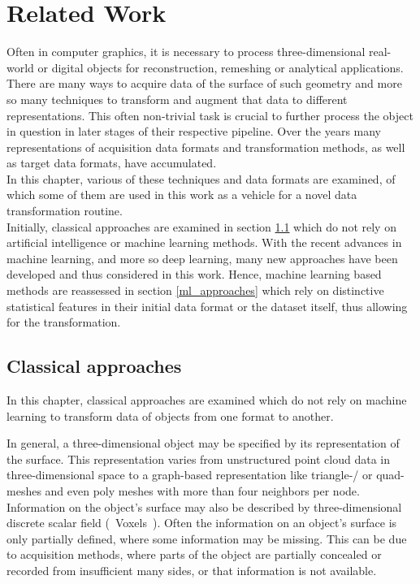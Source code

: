 \chapter{Related Work}
\label{sec:relatedwork}

Often in computer graphics, it is necessary to process three-dimensional real-world or digital objects for reconstruction, remeshing or analytical applications. There are many ways to acquire data of the surface of such geometry and more so many techniques to transform and augment that data to different representations. This often non-trivial task is crucial to further process the object in question in later stages of their respective pipeline. Over the years many representations of acquisition data formats and transformation methods, as well as target data formats, have accumulated.\\
In this chapter, various of these techniques and data formats are examined, of which some of them are used in this work as a vehicle for a novel data transformation routine.\\
Initially, classical approaches are examined in section \ref{classic_approaches} which do not rely on artificial intelligence or machine learning methods.
With the recent advances in machine learning, and more so deep learning, many new approaches have been developed and thus considered in this work.
Hence, machine learning based methods are reassessed in section \ref{ml_approaches} which rely on distinctive statistical features in their initial data format or the dataset itself, thus allowing for the transformation.
\section{Classical approaches}
\label{classic_approaches}
  In this chapter, classical approaches are examined which do not rely on machine
  learning to transform data of objects from one format to another. 

  In general, a three-dimensional object may be specified by its representation of the
  surface. This representation varies from unstructured point cloud data in three-dimensional space
  to a graph-based representation like triangle-/ or quad-meshes and even poly meshes
  with more than four neighbors per node. Information on the object's surface may also be described
  by three-dimensional discrete scalar field (~Voxels~).  Often the information on an object's
  surface is only partially defined, where some information may be missing. 
  This can be due to acquisition methods, where parts of the object are partially 
  concealed or recorded from insufficient many sides, or that information is not available.

